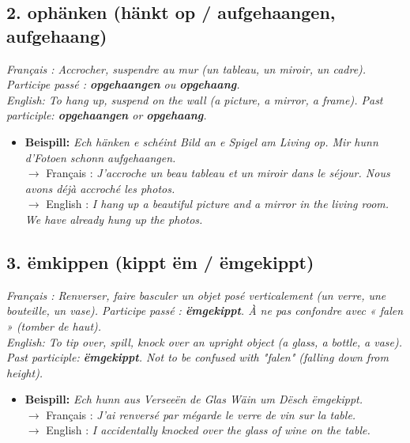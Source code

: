 \subsection*{2. ophänken (hänkt op / aufgehaangen, aufgehaang)}

\noindent\textit{Français : Accrocher, suspendre au mur (un tableau, un miroir, un cadre). Participe passé : \textbf{opgehaangen} ou \textbf{opgehaang}.}\\
\textit{English: To hang up, suspend on the wall (a picture, a mirror, a frame). Past participle: \textbf{opgehaangen} or \textbf{opgehaang}.}

\begin{itemize}
    \item \textbf{Beispill:} \textit{Ech hänken e schéint Bild an e Spigel am Living op. Mir hunn d'Fotoen schonn aufgehaangen.}\\
    $\rightarrow$ Français : \textit{J'accroche un beau tableau et un miroir dans le séjour. Nous avons déjà accroché les photos.}\\
    $\rightarrow$ English : \textit{I hang up a beautiful picture and a mirror in the living room. We have already hung up the photos.}
\end{itemize}

\subsection*{3. ëmkippen (kippt ëm / ëmgekippt)}

\noindent\textit{Français : Renverser, faire basculer un objet posé verticalement (un verre, une bouteille, un vase). Participe passé : \textbf{ëmgekippt}. À ne pas confondre avec « falen » (tomber de haut).}\\
\textit{English: To tip over, spill, knock over an upright object (a glass, a bottle, a vase). Past participle: \textbf{ëmgekippt}. Not to be confused with "falen" (falling down from height).}

\begin{itemize}
    \item \textbf{Beispill:} \textit{Ech hunn aus Verseeën de Glas Wäin um Dësch ëmgekippt.}\\
    $\rightarrow$ Français : \textit{J'ai renversé par mégarde le verre de vin sur la table.}\\
    $\rightarrow$ English : \textit{I accidentally knocked over the glass of wine on the table.}
\end{itemize}

